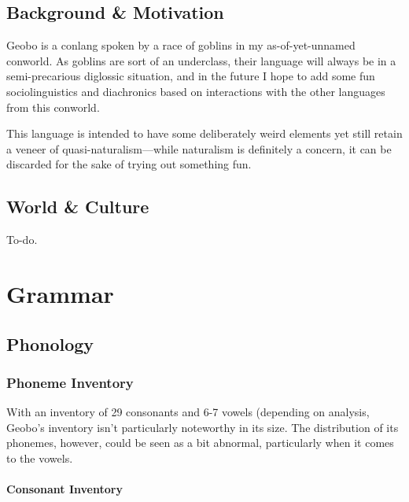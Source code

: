 \documentclass[a4paper,11pt,oneside,openany]{memoir}
\begin{document}
\begin{titlingpage}
\titleP
\end{titlingpage}
\frontmatter

\pagestyle{headings}

\chapter{Background \& Motivation}

Geobo{\engma} is a conlang spoken by a race of goblins in my as-of-yet-unnamed conworld. As goblins are sort of an underclass, their language will always be in a semi-precarious diglossic situation, and in the future I hope to add some fun sociolinguistics and diachronics based on interactions with the other languages from this conworld.

This language is intended to have some deliberately weird elements yet still retain a veneer of quasi-naturalism---while naturalism is definitely a concern, it can be discarded for the sake of trying out something fun.

\clearpage
\tableofcontents

\chapter{World \& Culture}

To-do.

\mainmatter

\part{Grammar}

\chapter{Phonology}

\section{Phoneme Inventory}

With an inventory of 29 consonants and 6-7 vowels (depending on analysis, Geobo\engma's inventory isn't particularly noteworthy in its size. The distribution of its phonemes, however, could be seen as a bit abnormal, particularly when it comes to the vowels.

\subsection{Consonant Inventory}
\end{document}
